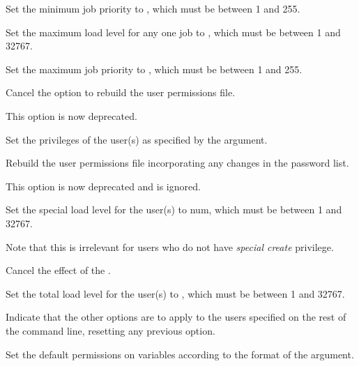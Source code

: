 Set the minimum job priority to , which must be between 1 and 255.


Set the maximum load level for any one job to , which must be between 1 and 32767.


Set the maximum job priority to , which must be between 1 and 255.


Cancel the  option to rebuild the user permissions file.

This option is now deprecated.


Set the privileges of the user(s) as specified by the argument.


Rebuild the user permissions file  incorporating any changes in the password list.

This option is now deprecated and is ignored.


Set the special load level for the user(s) to num, which must be between 1 and 32767.

Note that this is irrelevant for users who do not have \textit{special create} privilege.


Cancel the effect of the .


Set the total load level for the user(s) to , which must be between 1 and 32767.


Indicate that the other options are to apply to the users specified on the rest of the command line, resetting any previous
 option.


Set the default permissions on variables according to the format of the  argument.


